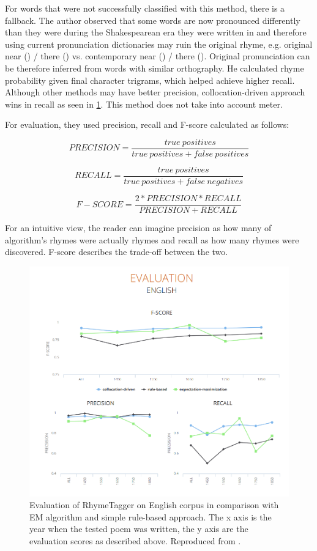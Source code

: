 For words that were not successfully classified with this method, there is a fallback. The author observed that some words are now pronounced differently than they were during the Shakespearean era they were written in and therefore using current pronunciation dictionaries may ruin the original rhyme, e.g. original near () / there () vs. contemporary near () / there (). Original pronunciation can be therefore inferred from words with similar orthography. He calculated rhyme probability given final character trigrams, which helped achieve higher recall. Although other methods may have better precision, collocation-driven approach wins in recall as seen in \ref{screenshotRT}. This method does not take into account meter.

For evaluation, they used precision, recall and F-score calculated as follows:

\[PRECISION=\frac{true\ positives}{true\ positives+false\ positives}\]

\[RECALL=\frac{true\ positives}{true\ positives+false\ negatives}\]

\[F-SCORE=\frac{2*PRECISION*RECALL}{PRECISION+RECALL}\]

For an intuitive view, the reader can imagine precision as how many of algorithm's rhymes were actually rhymes and recall as how many rhymes were discovered. F-score describes the trade-off between the two.

\begin{figure}[h]\centering
	\includegraphics[scale=0.4]{../img/plechac_eval.png}
	\caption[RhymeTagger evaluation]{Evaluation of RhymeTagger on English corpus in comparison with EM algorithm and simple rule-based approach. The x axis is the year when the tested poem was written, the y axis are the evaluation scores as described above. Reproduced from \cite{plechac2017presentation}.}
	\label{screenshotRT}
\end{figure}

